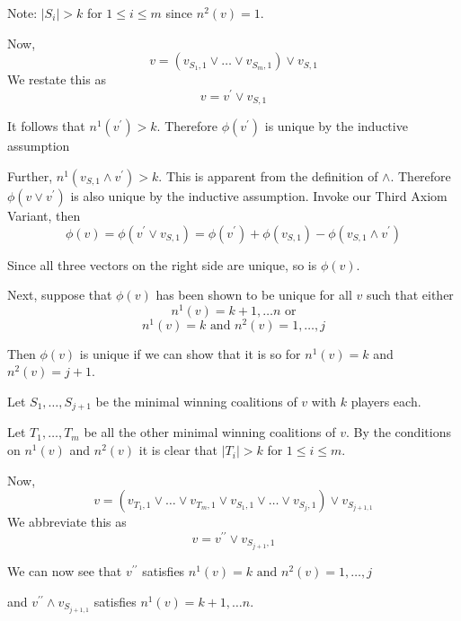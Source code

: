 \documentclass[
paper=128mm:96mm, %
fontsize=11pt, %
pagesize, %
parskip=half-, %
]{scrartcl} %
\theoremstyle{mythmstyle} %
\begin{document}
Note: $|S_{i}| > k$ for $1 \le i \le m$ since $n^{2}(v) = 1$.

\clearpage

Now,
\[ v = (v_{S_{1},1} \vee \dots \vee v_{S_{m},1}) \vee v_{S,1} \]
We restate this as
\[ v = v^{\prime} \vee v_{S,1} \]

It follows that $n^{1}(v^{\prime}) > k$. Therefore $\phi(v^{\prime})$ is unique by the inductive assumption

Further, $n^{1}(v_{S,1} \wedge v^{\prime}) > k$. This is apparent from the definition of $\wedge$. Therefore $\phi(v \vee v^{\prime})$ is also unique by the inductive assumption. Invoke our Third Axiom Variant, then
\[ \phi(v) = \phi(v^{\prime} \vee v_{S,1}) = \phi(v^{\prime}) + \phi(v_{S,1}) - \phi(v_{S,1} \wedge v^{\prime}) \]

Since all three vectors on the right side are unique, so is $\phi(v)$.

\clearpage

Next, suppose that $\phi(v)$ has been shown to be unique for all $v$ such that either
\[ n^{1}(v) = k + 1, \dots n \text{ or}\]
\[ n^{1}(v) = k \text{ and } n^{2}(v) = 1, \dots, j \]

Then $\phi(v)$ is unique if we can show that it is so for $n^{1}(v) = k$ and $n^{2}(v) = j + 1$.

\clearpage

Let $S_1, \dots, S_{j + 1}$ be the minimal winning coalitions of $v$ with $k$ players each.

Let $T_{1}, \dots, T_{m}$ be all the other minimal winning coalitions of $v$. By the conditions on $n^{1}(v)$ and $n^{2}(v)$ it is clear that $|T_{i}| > k$ for $1 \le i \le m$.

Now,
\[ v = (v_{T_{1},1} \vee \dots \vee v_{T_{m},1} \vee v_{S_{1},1} \vee \dots \vee v_{S_{j},1}) \vee v_{S_{j+1,1}} \]
We abbreviate this as
\[ v = v^{\prime\prime} \vee v_{S_{j+1},1} \]

\clearpage

We can now see that $v^{\prime\prime}$ satisfies $n^{1}(v) = k \text{ and } n^{2}(v) = 1, \dots, j$

and $v^{\prime\prime} \wedge v_{S_{j+1,1}}$ satisfies $n^{1}(v) = k + 1, \dots n$. 
\end{document}
